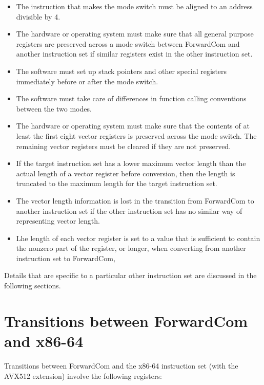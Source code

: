 \documentclass[forwardcom.tex]{subfiles}
\begin{document}
\begin{itemize}
\item The instruction that makes the mode switch must be aligned to an address divisible by 4.

\item The hardware or operating system must make sure that all general purpose registers are preserved across a mode switch between ForwardCom and another instruction set if similar registers exist in the other instruction set.

\item The software must set up stack pointers and other special registers immediately before or after the mode switch.

\item The software must take care of differences in function calling conventions between the two modes.

\item The hardware or operating system must make sure that the contents of at least the first eight vector registers is preserved across the mode switch. The remaining vector registers must be cleared if they are not preserved.

\item If the target instruction set has a lower maximum vector length than the actual length of a vector register before conversion, then the length is truncated to the maximum length for the target instruction set.

\item The vector length information is lost in the transition from ForwardCom to another instruction set if the other instruction set has no similar way of representing vector length.

\item Lhe length of each vector register is set to a value that is sufficient to contain the nonzero part of the register, or longer, when converting from another instruction set to ForwardCom, 

\end{itemize}

Details that are specific to a particular other instruction set are discussed in the following sections.

\section{Transitions between ForwardCom and x86-64}
Transitions between ForwardCom and the x86-64 instruction set (with the AVX512 extension) involve the following registers:
\end{document}
